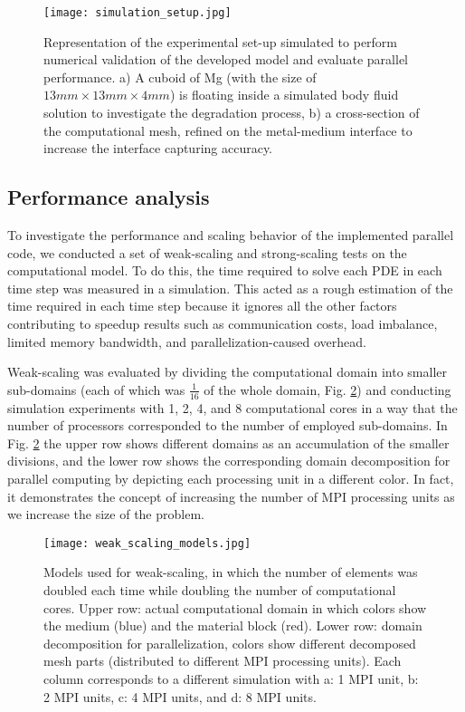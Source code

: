 \begin{figure}[h]
\centering
\medskip
\texttt{[image: simulation\_setup.jpg]}
\caption[Simulation setup for evaluating parallel performance]{Representation of the experimental set-up simulated  to perform numerical validation of the developed model and evaluate parallel performance. a) A cuboid of Mg (with the size of $13mm \times 13mm \times 4 mm$) is floating inside a simulated body fluid solution to investigate the degradation process, b) a cross-section of the computational mesh, refined on the metal-medium interface to increase the interface capturing accuracy.} \label{fig:simulation_setup_parallel}
\end{figure}


\subsection{Performance analysis}

To investigate the performance and scaling behavior of the implemented parallel code, we conducted a set of weak-scaling and strong-scaling tests on the computational model. To do this, the time required to solve each {PDE} in each time step was measured in a simulation. This acted as a rough estimation of the time required in each time step because it ignores all the other factors contributing to speedup results such as communication costs, load imbalance, limited memory bandwidth, and parallelization-caused overhead.

Weak-scaling was evaluated by dividing the computational domain into smaller sub-domains (each of which was $\frac{1}{16}$ of the whole domain, Fig. \ref{fig:weak_scaling_models}) and conducting simulation experiments with 1, 2, 4, and 8 computational cores in  a way  that the number of processors corresponded to the number of employed sub-domains. In Fig. \ref{fig:weak_scaling_models} the upper row shows different domains as an accumulation of the smaller divisions, and the lower row shows the corresponding domain decomposition for parallel computing by depicting each processing unit in a different color. In fact, it demonstrates the concept of increasing the number of {MPI} processing units as we increase the size of the problem.

\begin{figure}[h]
\centering
\medskip
\texttt{[image: weak\_scaling\_models.jpg]}
\caption[Models used for performing the weak-scaling test]{Models used for weak-scaling, in which the number of elements was doubled each time while doubling the number of computational cores. Upper row: actual computational domain in which colors show the medium (blue) and the material block (red). Lower row: domain decomposition for parallelization, colors show different decomposed mesh parts (distributed to different {MPI} processing units). Each column corresponds to a different simulation with a: 1 {MPI} unit, b: 2 {MPI} units, c: 4 {MPI} units, and d: 8 {MPI} units.} \label{fig:weak_scaling_models}
\end{figure}

